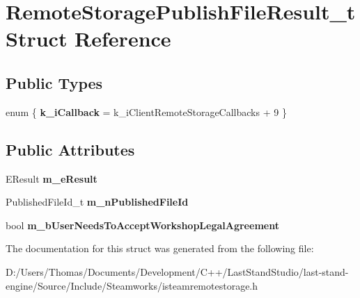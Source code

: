 \hypertarget{structRemoteStoragePublishFileResult__t}{}\section{Remote\+Storage\+Publish\+File\+Result\+\_\+t Struct Reference}
\label{structRemoteStoragePublishFileResult__t}
\subsection*{Public Types}
\begin{DoxyCompactItemize}
\item 
\hypertarget{structRemoteStoragePublishFileResult__t_a9853fc6c6a3e90ac2ac6239e9503c1fc}{}enum \{ {\bfseries k\+\_\+i\+Callback} = k\+\_\+i\+Client\+Remote\+Storage\+Callbacks + 9
 \}\label{structRemoteStoragePublishFileResult__t_a9853fc6c6a3e90ac2ac6239e9503c1fc}

\end{DoxyCompactItemize}
\subsection*{Public Attributes}
\begin{DoxyCompactItemize}
\item 
\hypertarget{structRemoteStoragePublishFileResult__t_a950adaf0881518a732f13d98da26d114}{}E\+Result {\bfseries m\+\_\+e\+Result}\label{structRemoteStoragePublishFileResult__t_a950adaf0881518a732f13d98da26d114}

\item 
\hypertarget{structRemoteStoragePublishFileResult__t_ac12c949583750f11396aca171309667e}{}Published\+File\+Id\+\_\+t {\bfseries m\+\_\+n\+Published\+File\+Id}\label{structRemoteStoragePublishFileResult__t_ac12c949583750f11396aca171309667e}

\item 
\hypertarget{structRemoteStoragePublishFileResult__t_a306faf18fefc438bc96c9c4b0b2a38f4}{}bool {\bfseries m\+\_\+b\+User\+Needs\+To\+Accept\+Workshop\+Legal\+Agreement}\label{structRemoteStoragePublishFileResult__t_a306faf18fefc438bc96c9c4b0b2a38f4}

\end{DoxyCompactItemize}


The documentation for this struct was generated from the following file\+:\begin{DoxyCompactItemize}
\item 
D\+:/\+Users/\+Thomas/\+Documents/\+Development/\+C++/\+Last\+Stand\+Studio/last-\/stand-\/engine/\+Source/\+Include/\+Steamworks/isteamremotestorage.\+h\end{DoxyCompactItemize}
